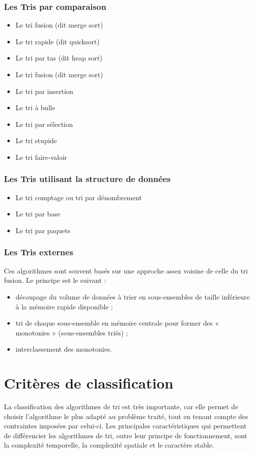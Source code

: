 \documentclass[11pt,a4paper]{article}
\begin{document}
\subsubsection{Les Tris par comparaison}
\begin{itemize}
    \item Le tri fusion (dit merge sort)
    \item Le tri rapide (dit quicksort)
    \item Le tri par tas (dit heap sort)
    \item Le tri fusion (dit merge sort)
    \item Le tri par insertion
    \item Le tri à bulle
    \item Le tri par sélection
    \item Le tri stupide
    \item Le tri faire-valoir
\end{itemize}
\newpage
\subsubsection{Les Tris utilisant la structure de données}
\begin{itemize}
    \item Le tri comptage ou tri par dénombrement
    \item Le tri par base
    \item Le tri par paquets
\end{itemize}

\subsubsection{Les Tris externes}
Ces algorithmes sont souvent basés sur une approche assez voisine de celle du tri fusion. Le principe est le suivant :
\vspace{0.2cm}

\begin{itemize}
    \item découpage du volume de données à trier en sous-ensembles de taille inférieure à la mémoire rapide disponible ;
    \item tri de chaque sous-ensemble en mémoire centrale pour former des « monotonies » (sous-ensembles triés) ;
    \item interclassement des monotonies.
\end{itemize}

\section{Critères de classification}
La classification des algorithmes de tri est très importante, car elle permet de choisir l’algorithme le plus adapté au problème traité, tout en tenant compte des contraintes imposées par celui-ci. Les principales caractéristiques qui permettent de différencier les algorithmes de tri, outre leur principe de fonctionnement, sont la complexité temporelle, la complexité spatiale et le caractère stable.
\end{document}
